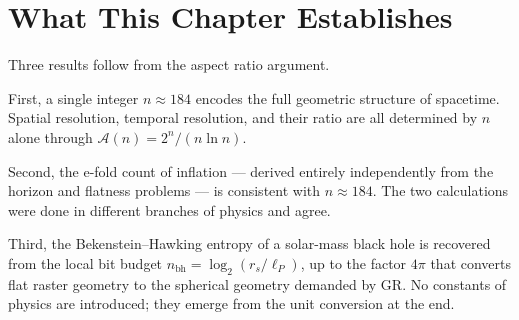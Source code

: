 \section{What This Chapter Establishes}

Three results follow from the aspect ratio argument.

First, a single integer $n \approx 184$ encodes the full geometric structure
of spacetime. Spatial resolution, temporal resolution, and their ratio are
all determined by $n$ alone through $\mathcal{A}(n) = 2^n / (n \ln n)$.

Second, the e-fold count of inflation --- derived entirely independently from
the horizon and flatness problems --- is consistent with $n \approx 184$.
The two calculations were done in different branches of physics and agree.

Third, the Bekenstein--Hawking entropy of a solar-mass black hole is
recovered from the local bit budget $n_{\mathrm{bh}} = \log_2(r_s/\ell_P)$,
up to the factor $4\pi$ that converts flat raster geometry to the spherical
geometry demanded by GR. No constants of physics are introduced; they emerge
from the unit conversion at the end.

